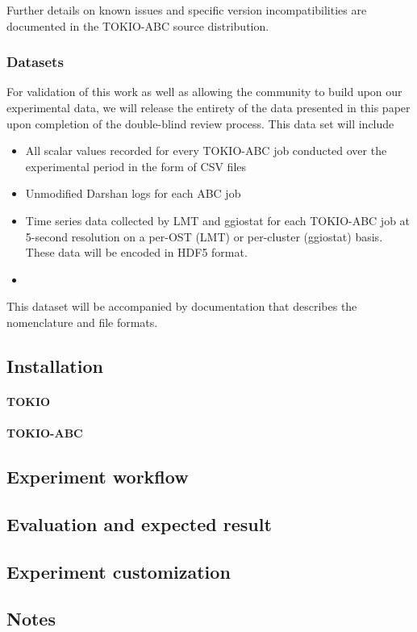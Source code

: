 Further details on known issues and specific version incompatibilities are documented in the TOKIO-ABC source distribution.

\subsubsection{Datasets}

For validation of this work as well as allowing the community to build upon our experimental data, we will release the entirety of the data presented in this paper upon completion of the double-blind review process.  This data set will include

\begin{itemize}
\item All scalar values recorded for every TOKIO-ABC job conducted over the experimental period in the form of CSV files
\item Unmodified Darshan logs for each ABC job
\item Time series data collected by LMT and ggiostat for each TOKIO-ABC job at 5-second resolution on a per-OST (LMT) or per-cluster (ggiostat) basis.  These data will be encoded in HDF5 format.
\item 
\end{itemize}

This dataset will be accompanied by documentation that describes the nomenclature and file formats.

\subsection{Installation}

\paragraph{TOKIO}

\paragraph{TOKIO-ABC}

\subsection{Experiment workflow}

\subsection{Evaluation and expected result}

\subsection{Experiment customization}

\subsection{Notes}

